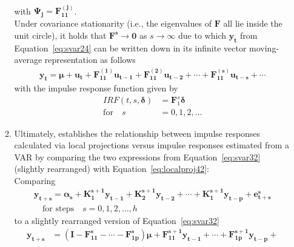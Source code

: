 \documentclass[a4paper,11pt,listof=nochaptergap,oneside,pointednumbers,bibtotoc,bigheadings,liststotoc]{scrbook}
\theoremstyle{mysatz}
\theoremstyle{mydefinition}
\theoremstyle{mybemerkung}
\newcommand{\vect}[1]{\boldsymbol{\mathbf{#1}}}
\begin{document}
\begin{itemize}
\begin{enumerate}
\begin{equation}
\begin{split}
	\end{split}								
	\end{equation}		
	with $\vect{\Psi_j} = \vect{F_{11}^{(j)}}$. \\
	Under covariance stationarity (i.e., the eigenvalues of $\vect{F}$ all lie inside the unit circle), it holds that $\vect{F^s} \to \vect{0}$ as $s \to \infty$ due to which $\vect{y_t}$ from Equation~\ref{eq:svar24} can be written down in its infinite vector moving-average representation as follows
	\begin{equation} \label{eq:svar33}
	\begin{split}
		\vect{y_t} = \vect{\mu} + \vect{u_t} + \vect{F_{11}^{(1)}}\vect{u_{t-1}} + \vect{F_{11}^{(2)}}\vect{u_{t-2}} + \cdots +  \vect{F_{11}^{(s)}}\vect{u_{t-s}} + \cdots
	\end{split}								
	\end{equation}	
	with the impulse response function given by
	\begin{equation}\label{eq:svar33a}
\begin{split}
	IRF(t, s, \vect{\delta}) & = {\vect{F}_1^s}\vect{\delta}  \\
	\text{for} \quad s & = 0, 1, 2, \dots
\end{split}
\end{equation}
	\item Ultimately, \citet{jorda:05} establishes the relationship between impulse responses calculated via local projections versus impulse responses estimated from a VAR by comparing the two expressions from Equation~\ref{eq:svar32} (slightly rearranged) with Equation~\ref{eq:localproj42}: \\Comparing
		\begin{equation} \label{eq:svar34}
	\begin{split}
		\vect{y_{t+s}} = \vect{\alpha_s} + \vect{K_1^{s+1}}\vect{y_{t-1}} + \vect{K_2^{s+1}}\vect{y_{t-2}} + \cdots + \vect{K_1^{s+1}}\vect{y_{t-p}} + \vect{e_{t+s}^s}\\
	\quad \text{for steps} \quad s=0, 1, 2, \dots, h 
	\end{split}								
	\end{equation}	
	to a slightly rearranged version of Equation~\ref{eq:svar32}
	\begin{equation} \label{eq:svar35}
	\begin{split}
		\vect{y_{t+s}} & = (\vect{I} - \vect{F_{11}^s} - \cdots - \vect{F_{1p}^s})\vect{\mu} + \vect{F_{11}^{s+1}}\vect{y_{t-1}} + \cdots + \vect{F_{1p}^{s+1}}\vect{y_{t-p}} + \\

\end{split}
\end{equation}
\end{enumerate}
\end{itemize}
\end{document}
